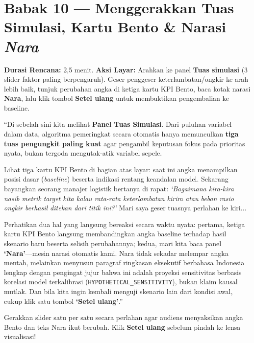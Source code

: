 \documentclass[11pt,a4paper,oneside]{book}
\newcommand{\code}[1]{{\small\nolinkurl{#1}}}
\begin{document}
\section{Babak 10 --- Menggerakkan Tuas Simulasi, Kartu Bento \& Narasi \emph{Nara}}

\begin{stagebox}
\textbf{Durasi Rencana:} 2,5 menit. \quad \textbf{Aksi Layar:} Arahkan ke panel \textbf{Tuas simulasi} (3 slider faktor paling berpengaruh). Geser penggeser keterlambatan/ongkir ke arah lebih baik, tunjuk perubahan angka di ketiga kartu KPI Bento, baca kotak narasi \textbf{Nara}, lalu klik tombol \textbf{Setel ulang} untuk membuktikan pengembalian ke baseline.
\end{stagebox}

\begin{scriptbox}
``Di sebelah sini kita melihat \textbf{Panel Tuas Simulasi}. Dari puluhan variabel dalam data, algoritma pemeringkat secara otomatis hanya memunculkan \textbf{tiga tuas pengungkit paling kuat} agar pengambil keputusan fokus pada prioritas nyata, bukan tergoda mengutak-atik variabel sepele.

Lihat tiga kartu KPI Bento di bagian atas layar: saat ini angka menampilkan posisi dasar (\emph{baseline}) beserta indikasi rentang keandalan model. Sekarang bayangkan seorang manajer logistik bertanya di rapat: \emph{`Bagaimana kira-kira nasib metrik target kita kalau rata-rata keterlambatan kirim atau beban rasio ongkir berhasil ditekan dari titik ini?'} Mari saya geser tuasnya perlahan ke kiri...

Perhatikan dua hal yang langsung bereaksi secara waktu nyata: pertama, ketiga kartu KPI Bento langsung membandingkan angka baseline terhadap hasil skenario baru beserta selisih perubahannya; kedua, mari kita baca panel \textbf{`Nara'}---mesin narasi otomatis kami. Nara tidak sekadar melempar angka mentah, melainkan menyusun paragraf ringkasan eksekutif berbahasa Indonesia lengkap dengan pengingat jujur bahwa ini adalah proyeksi sensitivitas berbasis korelasi model terkalibrasi (\code{HYPOTHETICAL_SENSITIVITY}), bukan klaim kausal mutlak. Dan bila kita ingin kembali menguji skenario lain dari kondisi awal, cukup klik satu tombol \textbf{`Setel ulang'}.''
\end{scriptbox}

\begin{tipbox}
Gerakkan slider satu per satu secara perlahan agar audiens menyaksikan angka Bento dan teks Nara ikut berubah. Klik \textbf{Setel ulang} sebelum pindah ke lensa visualisasi!
\end{tipbox}
\end{document}
